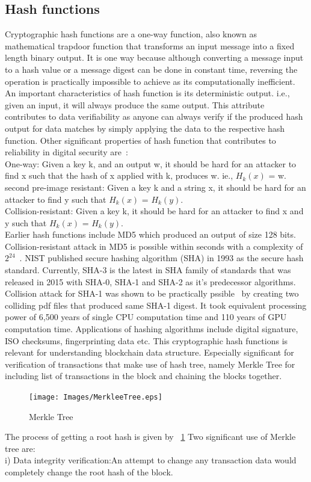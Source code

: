 \subsection{Hash functions}
Cryptographic hash functions are a one-way function, also known as mathematical
trapdoor function that transforms an input message into a fixed length binary
output. It is one way because although converting a message input to a hash
value or a message digest can be done in constant time, reversing the operation
is practically impossible to achieve as its computationally inefficient. An
important characteristics of hash function is its deterministic output. i.e.,
given an input, it will always produce the same output. This attribute
contributes to data verifiability as anyone can always verify if the produced
hash output for data matches by simply applying the data to the respective hash
function. 
Other significant properties of hash function that contributes to
reliability in digital security are~\cite{mironov2005hash}: \\
One-way: Given a key k, and an output w, it should be hard for an attacker to find x
such that the hash of x applied with k, produces w. ie., $H_k(x)$ = w.\\ 
second pre-image resistant: Given a key k and a string x, it should be hard for
an attacker to find y such that $H_k(x)$ = $H_k(y)$.\\ 
Collision-resistant: Given a key k, it should be hard for an attacker to find x and y such that
$H_k(x)$ = $H_k(y)$. \\
Earlier hash functions include MD5 which produced an output of size 128 bits.
Collision-resistant attack in MD5 is possible within seconds with a complexity
of $2^{24}$~\cite{wang2005break}. NIST published secure hashing algorithm (SHA)
in 1993 as the secure hash standard. Currently, SHA-3 is the latest in SHA
family of standards that was released in 2015 with SHA-0, SHA-1 and SHA-2 as
it's predecessor algorithms. Collision attack for SHA-1 was shown to be
practically pssible~\cite{stevens2017first} by creating two colliding pdf files
that produced same SHA-1 digest. It took equivalent processing power of 6,500
years of single CPU computation time and 110 years of GPU computation time.
Applications of hashing algorithms include digital signature, ISO checksums,
fingerprinting data etc. This cryptographic hash functions is relevant for
understanding blockchain data structure. Especially significant for
verification of transactions that make use of hash tree, namely Merkle Tree for
including list of transactions in the block and chaining the blocks together.
\begin{figure}
	\begin{center}
		\texttt{[image: Images/MerkleeTree.eps]}
		\caption{Merkle Tree}
		\label{fig:merkleTree}
	\end{center}
\end{figure}
The process of getting a root hash is given by ~\ref{fig:merkleTree} 
Two significant use of Merkle tree are: \\
i) Data integrity verification:An attempt to change any transaction data would
completely change the root hash of the block.  

